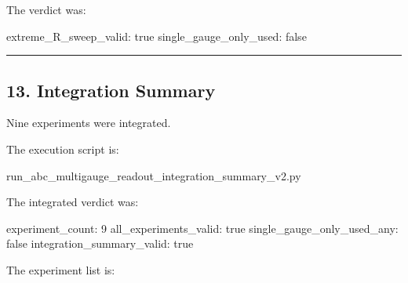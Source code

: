 \documentclass[
  a4paper,
]{article}
\newenvironment{Shaded}{}{}
\newcommand{\NormalTok}[1]{#1}
\begin{document}
The verdict was:

\begin{Shaded}
\begin{Highlighting}[]
\NormalTok{extreme\_R\_sweep\_valid: true}
\NormalTok{single\_gauge\_only\_used: false}
\end{Highlighting}
\end{Shaded}

\begin{center}\rule{0.5\linewidth}{0.5pt}\end{center}

\subsection{13. Integration Summary}\label{integration-summary}

Nine experiments were integrated.

The execution script is:

\begin{Shaded}
\begin{Highlighting}[]
\NormalTok{run\_abc\_multigauge\_readout\_integration\_summary\_v2.py}
\end{Highlighting}
\end{Shaded}

The integrated verdict was:

\begin{Shaded}
\begin{Highlighting}[]
\NormalTok{experiment\_count: 9}
\NormalTok{all\_experiments\_valid: true}
\NormalTok{single\_gauge\_only\_used\_any: false}
\NormalTok{integration\_summary\_valid: true}
\end{Highlighting}
\end{Shaded}

The experiment list is:
\end{document}
